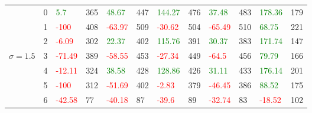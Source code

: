 \begin{table}[!htb]
\begin{adjustwidth}{-0.8in}{-0.9in}
\begin{tabular}{|p{4em}|p{2em}|p{3em}|p{3em}|p{3em}|p{3em}|p{3em}|p{3em}|p{3em}|p{3em}|p{3em}|p{3em}|}
            & 0 & \textcolor{green}{5.7} & 365 & \textcolor{green}{48.67} & 447 & \textcolor{green}{144.27} & 476 & \textcolor{green}{37.48} & 483 & \textcolor{green}{178.36} & 179\\\cline{3-12}
            & 1 & \textcolor{red}{-100} & 408 & \textcolor{red}{-63.97} & 509 & \textcolor{red}{-30.62} & 504 & \textcolor{red}{-65.49} & 510 & \textcolor{green}{68.75} & 221\\\cline{3-12}
            & 2 & \textcolor{red}{-6.09} & 302 & \textcolor{green}{22.37} & 402 & \textcolor{green}{115.76} & 391 & \textcolor{green}{30.37} & 383 & \textcolor{green}{171.74} & 147\\\cline{3-12}
            $\sigma=1.5$& 3 & \textcolor{red}{-71.49} & 389 & \textcolor{red}{-58.55} & 453 & \textcolor{red}{-27.34} & 449 & \textcolor{red}{-64.5} & 456 & \textcolor{green}{79.79} & 166\\\cline{3-12}
            & 4 & \textcolor{red}{-12.11} & 324 & \textcolor{green}{38.58} & 428 & \textcolor{green}{128.86} & 426 & \textcolor{green}{31.11} & 433 & \textcolor{green}{176.14} & 201\\\cline{3-12}
            & 5 & \textcolor{red}{-100} & 312 & \textcolor{red}{-51.69} & 402 & \textcolor{red}{-2.83} & 379 & \textcolor{red}{-46.45} & 386 & \textcolor{green}{88.52} & 175\\\cline{3-12}
            & 6 & \textcolor{red}{-42.58} & 77 & \textcolor{red}{-40.18} & 87 & \textcolor{red}{-39.6} & 89 & \textcolor{red}{-32.74} & 83 & \textcolor{red}{-18.52} & 102\\\hline\hline
            

\end{tabular}
\end{adjustwidth}
\end{table}
